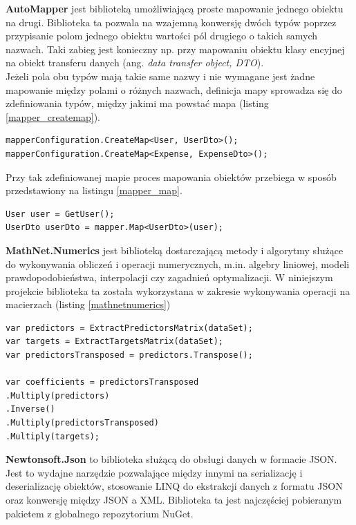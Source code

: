 \textbf{AutoMapper} jest biblioteką umożliwiającą proste mapowanie jednego obiektu na drugi.\cite{automapper} Biblioteka ta pozwala na wzajemną konwersję dwóch typów poprzez przypisanie polom jednego obiektu wartości pól drugiego o takich samych nazwach. Taki zabieg jest konieczny np. przy mapowaniu obiektu klasy encyjnej na obiekt transferu danych (ang. \textit{data transfer object, DTO}).\\
Jeżeli pola obu typów mają takie same nazwy i nie wymagane jest żadne mapowanie między polami o różnych nazwach, definicja mapy sprowadza się do zdefiniowania typów, między jakimi ma powstać mapa (listing \ref{mapper_createmap}).
\begin{lstlisting}[label={mapper_createmap}, caption={Definiowanie mapowania między dwoma typami.}, captionpos=b]
mapperConfiguration.CreateMap<User, UserDto>();
mapperConfiguration.CreateMap<Expense, ExpenseDto>();
\end{lstlisting}
Przy tak zdefiniowanej mapie proces mapowania obiektów przebiega w sposób przedstawiony na listingu \ref{mapper_map}.
\begin{lstlisting}[label={mapper_map}, caption={Mapowanie jednego obiektu na drugi.}, captionpos=b]
User user = GetUser();
UserDto userDto = mapper.Map<UserDto>(user);
\end{lstlisting}

\textbf{MathNet.Numerics} jest biblioteką dostarczającą metody i algorytmy służące do wykonywania obliczeń i operacji numerycznych, m.in. algebry liniowej, modeli prawdopodobieństwa, interpolacji czy zagadnień optymalizacji.\cite{mathnetnumerics} W niniejszym projekcie biblioteka ta została wykorzystana w zakresie wykonywania operacji na macierzach (listing \ref{mathnetnumerics})
\begin{lstlisting}[label={mathnetnumerics}, caption={Operacje na macierzach przy użyciu biblioteki MathNet.Numerics.}, captionpos=b]
var predictors = ExtractPredictorsMatrix(dataSet);
var targets = ExtractTargetsMatrix(dataSet);
var predictorsTransposed = predictors.Transpose();

var coefficients = predictorsTransposed
.Multiply(predictors)
.Inverse()
.Multiply(predictorsTransposed)
.Multiply(targets);
\end{lstlisting}

\textbf{Newtonsoft.Json} to biblioteka służącą do obsługi danych w formacie JSON. Jest to wydajne narzędzie pozwalające między innymi na serializację i deserializację obiektów, stosowanie LINQ do ekstrakcji danych z formatu JSON oraz konwersję między JSON a XML.\cite{newtonsoft} Biblioteka ta jest najczęściej pobieranym pakietem z globalnego repozytorium NuGet.\cite{nugetstats}
